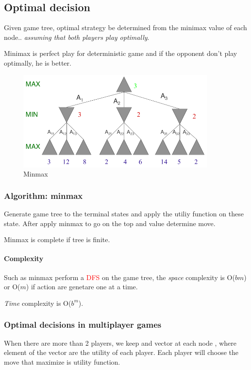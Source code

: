 \subsection{Optimal decision}
Given game tree, optimal strategy be determined from the minimax value of each
node.. \textit{assuming that both players play optimally}.

Minimax is perfect play for deterministic game and if the opponent don't play
optimally, he is better.

\begin{figure}[h]
    \centering
    \includegraphics[width=10cm]{minmax.png}
    \caption{Minmax}
\end{figure}

\subsubsection{Algorithm: minmax}
Generate game tree to the terminal states and apply the utiliy function on these state.
After apply minmax to go on the top and value determine move.

Minmax is complete if tree is finite.

\paragraph{Complexity} 
Such as minmax perform a \textcolor{red}{DFS} on the game tree, the \textit{space} complexity is O($bm$) 
or O($m$) if action are genetare one at a time.

\textit{Time} complexity is O($b^m$).

\subsubsection{Optimal decisions in multiplayer games}
When there are more than 2 players, we keep and vector at each node , where element of the vector are the 
utility of each player. Each player will choose the move that maximize is utility function.

